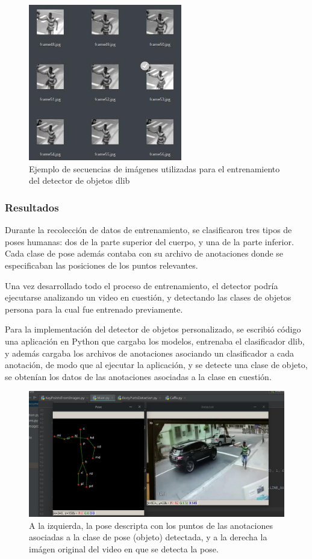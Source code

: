 \documentclass[a4paper,12pt,oneside,spanish]{book}
\begin{document}
\begin{figure}[h!]
	\includegraphics[width=190pt]{Imagenes/dataset1.jpg}
	\centering
	\caption{Ejemplo de secuencias de imágenes utilizadas para el entrenamiento del detector de objetos dlib}
	\label{fig:dataset1}
\end{figure}

\subsubsection{Resultados}
Durante la recolección de datos de entrenamiento, se clasificaron tres tipos de poses humanas: dos de la parte superior del cuerpo, y una de la parte inferior. Cada clase de pose además contaba con su archivo de anotaciones donde se especificaban las posiciones de los puntos relevantes.\par

Una vez desarrollado todo el proceso de entrenamiento, el detector podría ejecutarse analizando un video en cuestión, y detectando las clases de objetos persona para la cual fue entrenado previamente.\par

Para la implementación del detector de objetos personalizado, se escribió código una aplicación en Python que cargaba los modelos, entrenaba el clasificador dlib, y además cargaba los archivos de anotaciones asociando un clasificador a cada anotación, de modo que al ejecutar la aplicación, y se detecte una clase de objeto, se obtenían los datos de las anotaciones asociadas a la clase en cuestión.\par

\begin{figure}[h!]
	\includegraphics[width=330pt]{Imagenes/results1.jpg}
	\centering	
	\caption{A la izquierda, la pose descripta con los puntos de las anotaciones asociadas a la clase de pose (objeto) detectada, y a la derecha la imágen original del video en que se detecta la pose.}
	\label{fig:results1}
\end{figure}	
\end{document}
